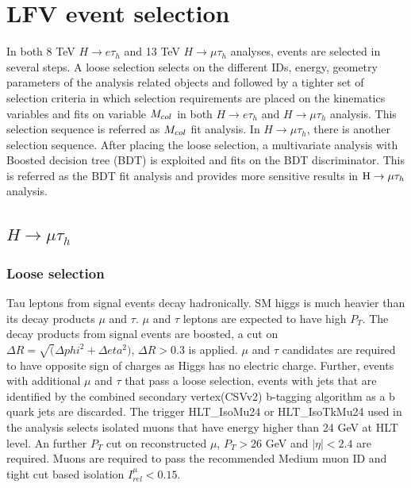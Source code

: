 %
%

\chapter{LFV event selection}
In both 8 TeV $H\rightarrow e\tau_h$ and 13 TeV $H\rightarrow\mu\tau_h$ analyses, events are selected in several steps. A loose selection selects on the different IDs, energy, geometry parameters of the analysis related objects and followed by a tighter set of selection criteria in which selection requirements are placed on the kinematics variables and fits on variable $M_{col}$ in both  $H\rightarrow e\tau_h$ and $H\rightarrow\mu\tau_h$ analysis. This selection sequence is referred as $M_{col}$ fit analysis. In $H\rightarrow\mu\tau_h$, there is another selection sequence. After placing the loose selection, a multivariate analysis with Boosted decision tree (BDT) is exploited and fits on the BDT discriminator. This is referred as the BDT fit analysis and provides more sensitive results in $\mathrm{H}\to \mu\tau_{h}$ analysis. 



\section{\texorpdfstring{$H\rightarrow\mu\tau_h$}{Lg}}
\subsection{Loose selection}
Tau leptons from signal events decay hadronically. SM higgs is much heavier than its decay products $\mu$ and $\tau$. $\mu$ and $\tau$ leptons are expected to have high $P_{T}$. The decay products from signal events are boosted, a cut on $\Delta R=\sqrt(\Delta phi^{2}+\Delta eta^{2})$, $\Delta R>0.3$ is applied. $\mu$ and $\tau$ candidates are required to have opposite sign of charges as Higgs has no electric charge. Further, events with additional $\mu$ and $\tau$ that pass a loose selection, events with jets that are identified by the combined secondary vertex(CSVv2) b-tagging algorithm \cite{btag_ago} as a b quark jets are discarded. The trigger HLT\_IsoMu24 or HLT\_IsoTkMu24 used in the analysis selects isolated muons that have energy higher than 24 GeV at HLT level. An further $P_{T}$ cut on reconstructed $\mu$,  $P_{T}>26$ GeV and $|\eta|<2.4$ are required. Muons are required to pass the recommended Medium muon ID and tight cut based isolation $I^{\mu}_{rel}<0.15$. %

